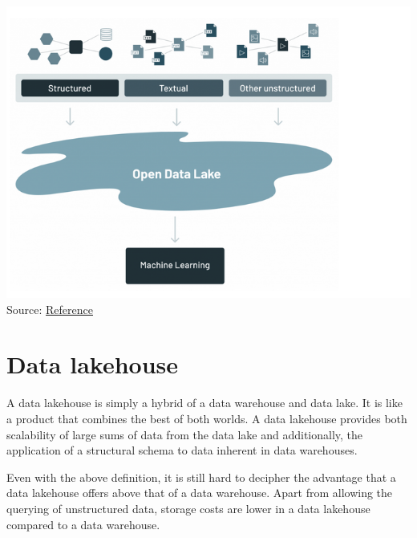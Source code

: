 \documentclass[
]{book}
\begin{document}
\includegraphics{./images/data_lake.png}
Source: \href{https://www.databricks.com/blog/2021/05/19/evolution-to-the-data-lakehouse.html}{Reference}

\hypertarget{data-lakehouse}{%
\section{Data lakehouse}\label{data-lakehouse}}

A data lakehouse is simply a hybrid of a data warehouse and data lake. It is like a product that combines the best of both worlds. A data lakehouse provides both scalability of large sums of data from the data lake and additionally, the application of a structural schema to data inherent in data warehouses.

Even with the above definition, it is still hard to decipher the advantage that a data lakehouse offers above that of a data warehouse. Apart from allowing the querying of unstructured data, storage costs are lower in a data lakehouse compared to a data warehouse.
\end{document}
